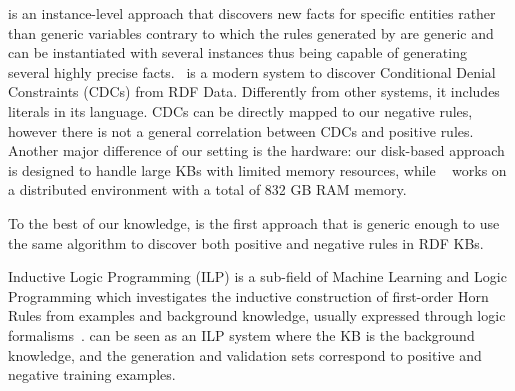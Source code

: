 
\cite{abedjan2014amending} is an instance-level approach that discovers new facts for specific entities rather than generic variables contrary to which the rules generated by \krd are 
generic and can be instantiated with several instances thus being capable of generating several highly precise facts.~\cite{DBLP:conf/sigmod/FaridRIHC16} is a modern system to discover Conditional Denial Constraints (CDCs) from RDF Data. Differently from other systems, it includes literals in its language. CDCs can be directly mapped to our negative rules, however there is not a general correlation between CDCs and positive rules. Another major difference of
our setting is the hardware: our disk-based approach is designed to handle large KBs with limited memory resources, while ~\cite{DBLP:conf/sigmod/FaridRIHC16} works on a distributed environment with a total of 832 GB RAM memory.

To the best of our knowledge, \krd is the first approach that is generic enough to use the same algorithm to discover both positive and negative rules in RDF KBs.

Inductive Logic Programming (ILP) is a sub-field of Machine Learning and Logic Programming which investigates the inductive construction of first-order Horn Rules from examples and background knowledge, usually expressed through logic formalisms~\cite{muggleton1994inductive}. \krd can be seen as an ILP system where the KB is the background knowledge, and the generation and validation sets correspond to positive and negative training examples.

